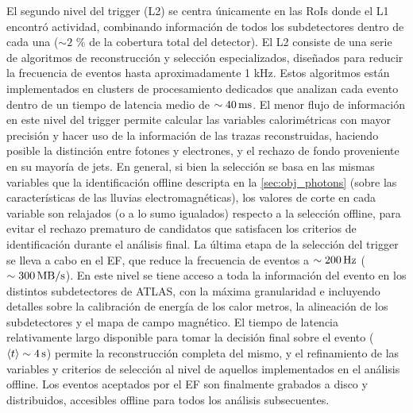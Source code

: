 El segundo nivel del trigger (L2) se centra únicamente en las RoIs donde el L1
encontró actividad, combinando información de todos los subdetectores dentro de
cada una ($\sim 2$ \% de la cobertura total del detector). El L2 consiste de una
serie de algoritmos de reconstrucción y selección especializados, dise\~nados
para reducir la frecuencia de eventos hasta aproximadamente 1 kHz. Estos
algoritmos están implementados en clusters de procesamiento dedicados
que analizan cada evento dentro de un tiempo de latencia medio de $\sim
\unit[40]{ms}$. El menor flujo de información en este nivel del trigger permite
calcular las variables calorimétricas con mayor precisión y hacer uso de la
información de las trazas reconstruidas, haciendo posible la distinción entre
fotones y electrones, y el rechazo de fondo proveniente en su mayoría de jets.
En general, si bien la selección se basa en las mismas variables que la
identificación offline descripta en la \cref{sec:obj_photons} (sobre las características de
las lluvias electromagnéticas), los valores de corte en cada variable son
relajados (o a lo sumo igualados) respecto a la selección offline, para evitar
el rechazo prematuro de candidatos que satisfacen los criterios de identificación
durante el análisis final. La última etapa de la selección del trigger se lleva
a cabo en el EF, que reduce la frecuencia de eventos a $\sim
\unit[200]{Hz}$ ($\sim \unit[300]{MB/s}$). En este nivel se tiene acceso a toda
la información del evento en los distintos subdetectores de ATLAS, con la máxima
granularidad e incluyendo detalles sobre la calibración de energía de los
calor metros, la alineación de los subdetectores y el mapa de campo magnético. El
tiempo de latencia relativamente largo disponible para tomar la decisión final
sobre el evento ($\avg{t} \sim \unit[4]{s}$) permite la reconstrucción completa
del mismo, y el refinamiento de las variables y criterios de selección al nivel
de aquellos implementados en el análisis offline. Los eventos aceptados por el
EF son finalmente grabados a disco y distribuidos, accesibles offline para todos
los análisis subsecuentes.

